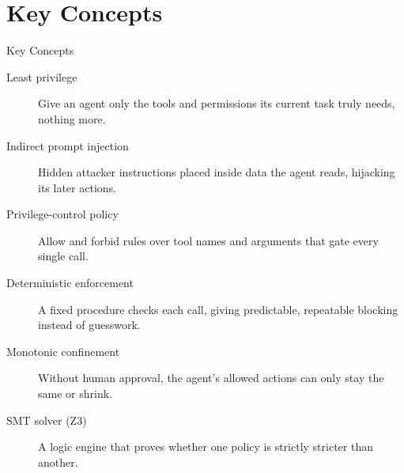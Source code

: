 \documentclass[10pt]{beamer}
\begin{document}
\section{Key Concepts}
\begin{frame}[allowframebreaks]{Key Concepts}
  \begin{description}
    \item[Least privilege] Give an agent only the tools and permissions its current task truly needs, nothing more.
    \item[Indirect prompt injection] Hidden attacker instructions placed inside data the agent reads, hijacking its later actions.
    \item[Privilege-control policy] Allow and forbid rules over tool names and arguments that gate every single call.
    \item[Deterministic enforcement] A fixed procedure checks each call, giving predictable, repeatable blocking instead of guesswork.
    \item[Monotonic confinement] Without human approval, the agent's allowed actions can only stay the same or shrink.
    \item[SMT solver (Z3)] A logic engine that proves whether one policy is strictly stricter than another.
  \end{description}
\end{frame}
\end{document}

